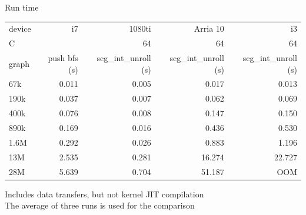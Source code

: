 \documentclass{beamer}
\begin{document}
\begin{frame}{Run time}
  \begin{table}[]
    \small
    \centering
    \begin{tabular}{lrrrr}
      device & i7           & 1080ti               & Arria 10             & i3                   \\
      C &              & 64                   & 64                   & 64                   \\
      graph & push bfs (s) & scg\_int\_unroll (s) & scg\_int\_unroll (s) & scg\_int\_unroll (s) \\
      67k   & 0.011        & 0.005                & 0.017                & 0.013                \\
      190k  & 0.037        & 0.007                & 0.062                & 0.069                \\
      400k  & 0.076        & 0.008                & 0.147                & 0.150                \\
      890k  & 0.169        & 0.016                & 0.436                & 0.530                \\
      1.6M  & 0.292        & 0.026                & 0.883                & 1.196                \\
      13M   & 2.535        & 0.281                & 16.274               & 22.727               \\
      28M   & 5.639        & 0.704                & 51.187               & OOM                 
    \end{tabular}
  \end{table}
  Includes data transfers, but not kernel JIT compilation\\
  The average of three runs is used for the comparison
\end{frame}
\end{document}

